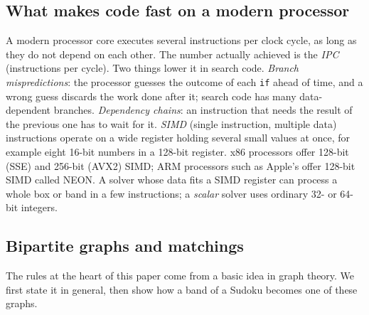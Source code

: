 \documentclass[11pt]{article}
\theoremstyle{definition}
\theoremstyle{plain}
\begin{document}
\subsection{What makes code fast on a modern processor}

A modern processor core executes several instructions per clock cycle, as long as they do not depend on each other.
The number actually achieved is the \emph{IPC} (instructions per cycle). Two things lower it in search code.
\emph{Branch mispredictions}: the processor guesses the outcome of each \texttt{if} ahead of time, and a wrong guess
discards the work done after it; search code has many data-dependent branches. \emph{Dependency chains}: an
instruction that needs the result of the previous one has to wait for it. \emph{SIMD} (single instruction, multiple
data) instructions operate on a wide register holding several small values at once, for example eight 16-bit numbers
in a 128-bit register. x86 processors offer 128-bit (SSE) and 256-bit (AVX2) SIMD; ARM processors such as Apple's
offer 128-bit SIMD called NEON. A solver whose data fits a SIMD register can process a whole box or band in a few
instructions; a \emph{scalar} solver uses ordinary 32- or 64-bit integers.

\subsection{Bipartite graphs and matchings}

The rules at the heart of this paper come from a basic idea in graph theory. We first state it in general, then show
how a band of a Sudoku becomes one of these graphs.
\end{document}
